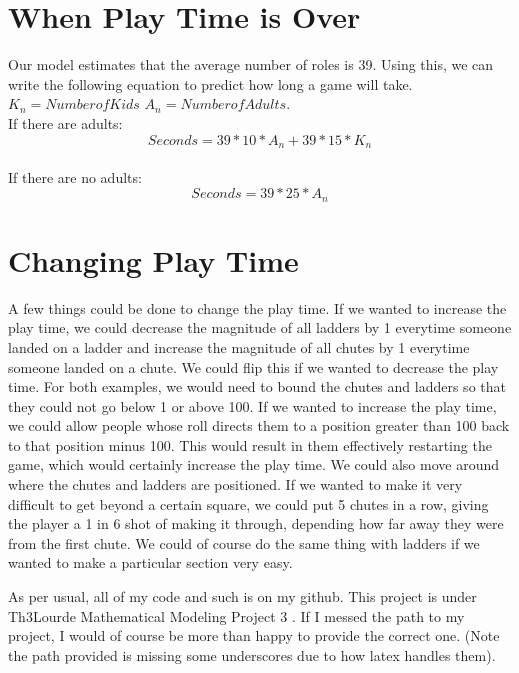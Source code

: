 \documentclass[12pt]{article} %
\begin{document}
\section*{When Play Time is Over}
Our model estimates that the average number of roles is 39. Using this, we can write the following equation to predict how long a game will take. $K_{n}=Number of Kids$ $A_{n}=Number of Adults$.
\\If there are adults:
\[Seconds = 39*10*A_{n} + 39*15*K_{n}\]
\\If there are no adults:
\[Seconds = 39*25*A_{n}\]

\section*{Changing Play Time}
A few things could be done to change the play time. If we wanted to increase the play time, we could decrease the magnitude of all ladders by 1 everytime someone landed on a ladder and increase the magnitude of all chutes by 1 everytime someone landed on a chute. We could flip this if we wanted to decrease the play time. For both examples, we would need to bound the chutes and ladders so that they could not go below 1 or above 100. If we wanted to increase the play time, we could allow people whose roll directs them to a position greater than 100 back to that position minus 100. This would result in them effectively restarting the game, which would certainly increase the play time. We could also move around where the chutes and ladders are positioned. If we wanted to make it very difficult to get beyond a certain square, we could put 5 chutes in a row, giving the player a 1 in 6 shot of making it through, depending how far away they were from the first chute. We could of course do the same thing with ladders if we wanted to make a particular section very easy.

As per usual, all of my code and such is on my github. This project is under Th3Lourde Mathematical Modeling Project 3 . If I messed the path to my project, I would of course be more than happy to provide the correct one. (Note the path provided is missing some underscores due to how latex handles them).
\end{document}
